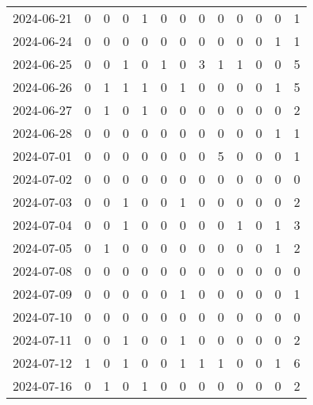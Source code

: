 \documentclass[dvipdfmx,oneside]{article}
\begin{document}
\begin{longtable}{lcccccccccccc}
        2024-06-21 &     0 &     0 &     0 &     1 &     0 &     0 &     0 &     0 &     0 &     0 &     0 &      1 \\
        2024-06-24 &     0 &     0 &     0 &     0 &     0 &     0 &     0 &     0 &     0 &     0 &     1 &      1 \\
        2024-06-25 &     0 &     0 &     1 &     0 &     1 &     0 &     3 &     1 &     1 &     0 &     0 &      5 \\
        2024-06-26 &     0 &     1 &     1 &     1 &     0 &     1 &     0 &     0 &     0 &     0 &     1 &      5 \\
        2024-06-27 &     0 &     1 &     0 &     1 &     0 &     0 &     0 &     0 &     0 &     0 &     0 &      2 \\
        2024-06-28 &     0 &     0 &     0 &     0 &     0 &     0 &     0 &     0 &     0 &     0 &     1 &      1 \\
        2024-07-01 &     0 &     0 &     0 &     0 &     0 &     0 &     0 &     5 &     0 &     0 &     0 &      1 \\
        2024-07-02 &     0 &     0 &     0 &     0 &     0 &     0 &     0 &     0 &     0 &     0 &     0 &      0 \\
        2024-07-03 &     0 &     0 &     1 &     0 &     0 &     1 &     0 &     0 &     0 &     0 &     0 &      2 \\
        2024-07-04 &     0 &     0 &     1 &     0 &     0 &     0 &     0 &     0 &     1 &     0 &     1 &      3 \\
        2024-07-05 &     0 &     1 &     0 &     0 &     0 &     0 &     0 &     0 &     0 &     0 &     1 &      2 \\
        2024-07-08 &     0 &     0 &     0 &     0 &     0 &     0 &     0 &     0 &     0 &     0 &     0 &      0 \\
        2024-07-09 &     0 &     0 &     0 &     0 &     0 &     1 &     0 &     0 &     0 &     0 &     0 &      1 \\
        2024-07-10 &     0 &     0 &     0 &     0 &     0 &     0 &     0 &     0 &     0 &     0 &     0 &      0 \\
        2024-07-11 &     0 &     0 &     1 &     0 &     0 &     1 &     0 &     0 &     0 &     0 &     0 &      2 \\
        2024-07-12 &     1 &     0 &     1 &     0 &     0 &     1 &     1 &     1 &     0 &     0 &     1 &      6 \\
        2024-07-16 &     0 &     1 &     0 &     1 &     0 &     0 &     0 &     0 &     0 &     0 &     0 &      2 \\

\end{longtable}
\end{document}
